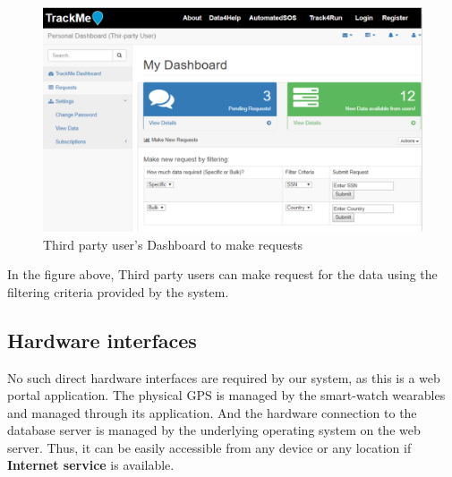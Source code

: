 \documentclass[hidelinks, 12pt]{report}
\begin{document}
\begin{figure}[H]
\centering
\includegraphics[scale=0.35]{../Assets/Make_Request.png}\caption[UI: Third party user's Dashboard to make requests]{Third party user's Dashboard to make requests}
\label{fig:Make_Request}
\end{figure}

In the figure above, Third party users can make request for the data using the filtering criteria provided by the system.

\subsection{Hardware interfaces}
No such direct hardware interfaces are required by our system, as this is a web portal application. The physical GPS is managed by the smart-watch wearables and managed through its application. And the hardware connection to the database server is managed by the underlying operating system on the web server. Thus, it can be easily accessible from any device or any location if \textbf{Internet service} is available.
\end{document}
